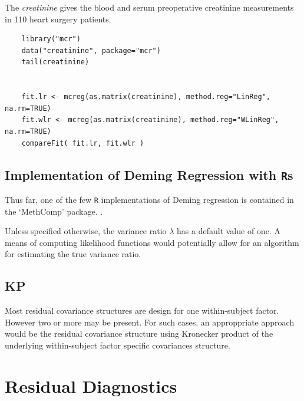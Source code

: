 \documentclass[12pt, a4paper]{report}
\theoremstyle{plain}
\theoremstyle{definition}
\theoremstyle{remark}
\begin{document}
The \textit{creatinine} gives the blood and serum preoperative creatinine measurements in 110 heart surgery patients.

\begin{framed}
	\begin{verbatim}
	library("mcr")
	data("creatinine", package="mcr")
	tail(creatinine)
	
	
	fit.lr <- mcreg(as.matrix(creatinine), method.reg="LinReg", na.rm=TRUE)
	fit.wlr <- mcreg(as.matrix(creatinine), method.reg="WLinReg", na.rm=TRUE)
	compareFit( fit.lr, fit.wlr )
	\end{verbatim}
\end{framed}


\section{Implementation of Deming Regression with \texttt{R}s}
Thus far, one of the few \texttt{R} implementations of Deming regression is contained in the `MethComp' package. \citep{BXC2008}.

Unless specified otherwise, the variance ratio $\lambda$ has a default value of one. A means of computing likelihood functions would potentially allow for an algorithm for estimating the true variance ratio.







\section{KP}
Most residual covariance structures are design for one
within-subject factor. However two or more may be present. For
such cases, an approppriate approach would be the residual
covariance structure using Kronecker product of the underlying
within-subject factor specific covariances structure.



	\chapter{Residual Diagnostics}
\end{document}
